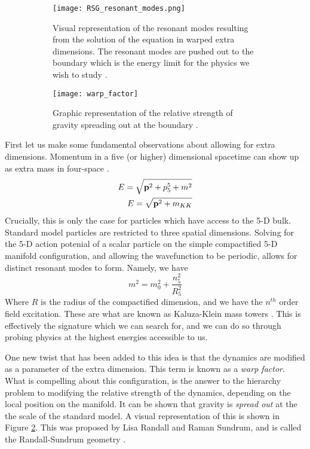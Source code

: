 \documentclass[12pt]{article}
\begin{document}
\begin{figure}[t]
    \centering
    \begin{subfigure}[t]{.48\textwidth}
        \centering
        \texttt{[image: RSG\_resonant\_modes.png]}
        \caption{Visual representation of the resonant modes resulting from the
        solution of the equation in warped extra dimensions. The resonant modes
        are pushed out to the boundary which is the energy limit for the physics we
        wish to study \cite{bsm}.}
        \label{subfig:RSG_resonant_modes}
    \end{subfigure}
    \hfill
    \begin{subfigure}[t]{.48\textwidth}
        \centering
        \texttt{[image: warp\_factor]}
        \caption{Graphic representation of the relative strength of gravity
        spreading out at the boundary \cite{bsm}.}
        \label{subfig:warp_factor}
    \end{subfigure}
\caption{}
\label{fig:theoretical_motivation_figure}
\end{figure}

First let us make some fundamental observations about allowing for extra
dimensions. Momentum in a five (or higher) dimensional spacetime can show up as
extra mass in four-space \cite{KALUZA_2018, bsm}. 
\begin{align}
    E = \sqrt{\vb{p}^2 + p_5^5 + m^2} \\
    E = \sqrt{\vb{p}^2 + m_{KK}}
\end{align}
Crucially, this is only the case for particles which have access to the 5-D
bulk. Standard model particles are restricted to three spatial dimensions.
Solving for the 5-D action potenial of a scalar particle on the simple
compactified 5-D manifold configuration, and allowing the wavefunction to be
periodic, allows for distinct resonant modes to form. Namely, we have
\begin{equation}
    m^2 = m_0^2 + \frac{n_5^2}{R_5^2}
\end{equation}
Where $R$ is the radius of the compactified dimension, and we have the $n^{th}$
order field excitation. These are what are known as Kaluza-Klein mass towers
\cite{KALUZA_2018, bsm}. This is effectively the signature which we can search
for, and we can do so through probing physics at the highest energies accessible
to us.

One new twist that has been added to this idea is that the dynamics are modified
as a parameter of the extra dimension. This term is known as a \textit{warp
factor}. What is compelling about this configuration, is the answer to the
hierarchy problem to modifying the relative strength of the dynamics, depending
on the local position on the manifold. It can be shown that gravity is
\textit{spread out} at the the scale of the standard model. A visual
representation of this is shown in Figure \ref{subfig:warp_factor}. This was
proposed by Lisa Randall and Raman Sundrum, and is called the Randall-Sundrum
geometry \cite{RandallSundrumOriginal, bsm}.
\end{document}
